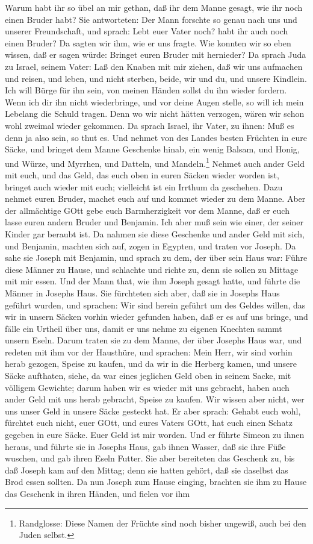 \begin{schriftzitat}
Warum habt ihr so übel an mir gethan, daß ihr dem Manne gesagt, wie ihr noch einen Bruder habt? Sie antworteten: Der Mann forschte so genau nach uns und unserer Freundschaft, und sprach: Lebt euer Vater noch? habt ihr auch noch einen Bruder? Da sagten wir ihm, wie er uns fragte. Wie konnten wir so eben wissen, daß er sagen würde: Bringet euren Bruder mit hernieder? Da sprach Juda zu Israel, seinem Vater: Laß den Knaben mit mir ziehen, daß wir uns aufmachen und reisen, und leben, und nicht sterben, beide, wir und du, und unsere Kindlein. Ich will Bürge für ihn sein, von meinen Händen sollst du ihn wieder fordern. Wenn ich dir ihn nicht wiederbringe, und vor deine Augen stelle, so will ich mein Lebelang die Schuld tragen. Denn wo wir nicht hätten verzogen, wären wir schon wohl zweimal wieder gekommen. Da sprach Israel, ihr Vater, zu ihnen: Muß es denn ja also sein, so thut es. Und nehmet von des Landes besten Früchten in eure Säcke, und bringet dem Manne Geschenke hinab, ein wenig Balsam, und Honig, und Würze, und Myrrhen, und Datteln, und Mandeln.\footnote{Randglosse: Diese Namen der Früchte sind noch bisher ungewiß, auch bei den Juden selbst.} Nehmet auch ander Geld mit euch, und das Geld, das euch oben in euren Säcken wieder worden ist, bringet auch wieder mit euch; vielleicht ist ein Irrthum da geschehen. Dazu nehmet euren Bruder, machet euch auf und kommet wieder zu dem Manne. Aber der allmächtige GOtt gebe euch Barmherzigkeit vor dem Manne, daß er euch lasse euren andern Bruder und Benjamin. Ich aber muß sein wie einer, der seiner Kinder gar beraubt ist. Da nahmen sie diese Geschenke und ander Geld mit sich, und Benjamin, machten sich auf, zogen in Egypten, und traten vor Joseph. Da sahe sie Joseph mit Benjamin, und sprach zu dem, der über sein Haus war: Führe diese Männer zu Hause, und schlachte und richte zu, denn sie sollen zu Mittage mit mir essen. Und der Mann that, wie ihm Joseph gesagt hatte, und führte die Männer in Josephs Haus. Sie fürchteten sich aber, daß sie in Josephs Haus geführt wurden, und sprachen: Wir sind herein geführt um des Geldes willen, das wir in unsern Säcken vorhin wieder gefunden haben, daß er es auf uns bringe, und fälle ein Urtheil über uns, damit er uns nehme zu eigenen Knechten sammt unsern Eseln. Darum traten sie zu dem Manne, der über Josephs Haus war, und redeten mit ihm vor der Hausthüre, und sprachen: Mein Herr, wir sind vorhin herab gezogen, Speise zu kaufen, und da wir in die Herberg kamen, und unsere Säcke aufthaten, siehe, da war eines jeglichen Geld oben in seinem Sacke, mit völligem Gewichte; darum haben wir es wieder mit uns gebracht, haben auch ander Geld mit uns herab gebracht, Speise zu kaufen. Wir wissen aber nicht, wer uns unser Geld in unsere Säcke gesteckt hat. Er aber sprach: Gehabt euch wohl, fürchtet euch nicht, euer GOtt, und eures Vaters GOtt, hat euch einen Schatz gegeben in eure Säcke. Euer Geld ist mir worden. Und er führte Simeon zu ihnen heraus, und führte sie in Josephs Haus, gab ihnen Wasser, daß sie ihre Füße wuschen, und gab ihren Eseln Futter. Sie aber bereiteten das Geschenk zu, bis daß Joseph kam auf den Mittag; denn sie hatten gehört, daß sie daselbst das Brod essen sollten. Da nun Joseph zum Hause einging, brachten sie ihm zu Hause das Geschenk in ihren Händen, und fielen vor ihm 
\end{schriftzitat}
